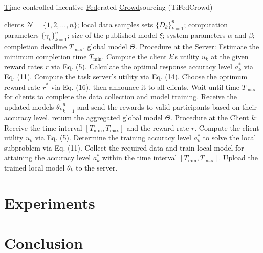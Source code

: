 \documentclass[final,1p,times]{elsarticle}
\begin{document}
\begin{algorithm}[H]
	\caption{\underline {Ti}me-controlled incentive \underline{Fed}erated \underline{Crowd}sourcing (TiFedCrowd)}
	\label{Algo1}
	\begin{algorithmic}[1]
		\REQUIRE clients $\bm{\mathcal{N}} = \{1,2,\dots,n\}$; local data samples sets $\{D_k\}_{k=1}^n$; computation
		parameters $\{\gamma_k\}_{k=1}^n$; size of the published model $\xi$;  system parameters $\alpha$ and $\beta$; completion deadline $T_{\max}$.
		\ENSURE  global model $\Theta$.
		\STATE Procedure at the Server:
		\STATE Estimate the minimum completion time $T_{\min}$.
		\STATE Compute the client $k$’s utility $u_k$ at the given reward rates $r$ via Eq. (5).
		\STATE Calculate the optimal response accuracy level $a_k^\ast$ via Eq. (11).
		\ENDIF
		\ENDFOR
		\STATE Compute the task server’s utility via Eq. (14).
		\STATE Choose the optimum reward rate $r^\ast$ via Eq. (16), then announce it to all clients.
		\STATE Wait until time $T_{\max}$ for clients to complete the data collection and model training.
		\STATE Receive the updated models ${\theta_k}_{k=1}^n$ and send the rewards to valid participants based on their accuracy level.
		\STATE return the aggregated global model $\Theta$.
		\STATE Procedure at the Client $k$:
		\STATE Receive the time interval $[T_{\min},T_{\max}]$ and the reward rate $r$.
		\STATE Compute the client utility $u_k$ via Eq. (5).
		\STATE Determine the training accuracy level $a_k^\ast$
		to solve the local subproblem via Eq. (11).
		\STATE Collect the required data and train local model for attaining the accuracy level $a_k^\ast$ within the time interval $[T_{\min},T_{\max}]$.
		\STATE Upload the trained local model $\theta_k$ to the server.
	\end{algorithmic}
\end{algorithm}
\section{Experiments} \label{sec:exp}
\section{Conclusion} \label{sec:con}


\end{document}
